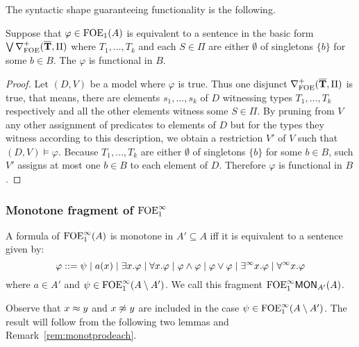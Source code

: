 The syntactic shape guaranteeing functionality is the following.
\begin{proposition}\label{lemma:functionalsentenceofoe} Suppose that $\varphi \in \mathrm{FOE}_1(A)$ is equivalent to a sentence in the basic form $\bigvee \nabla^+_{\mathrm{FOE}}(\overline{{\mathbf{T}}},\Pi)$ where $T_1, \dots, T_k$ and each $S \in \Pi$ are either $\emptyset$ of singletons $\{b\}$ for some $b \in B$. The $\varphi$ is functional in $B$.
\end{proposition}
\begin{proof} Let $(D,V)$ be a model where $\varphi$ is true. Thus one disjunct $\nabla^+_{\mathrm{FOE}}(\overline{{\mathbf{T}}},\Pi)$ is true, that means, there are elements $s_1, \dots, s_k$ of $D$ witnessing types $T_1, \dots, T_k$ respectively and all the other elements witness some $S \in \Pi$. By pruning from $V$ any other assignment of predicates to elements of $D$ but for the types they witness according to this description, we obtain a restriction $V'$ of $V$ such that $(D,V) \models \varphi$. Because $T_1, \dots, T_k$ are either $\emptyset$ of singletons $\{b\}$ for some $b \in B$, such $V'$ assigns at most one $b \in B$ to each element of $D$. Therefore $\varphi$ is functional in $B$.
\end{proof}


\subsubsection{Monotone fragment of $\mathrm{FOE}^{\infty}_1$}

\begin{theorem}\label{thm:ofoeimonot}
A formula of $\mathrm{FOE}^{\infty}_1(A)$ is monotone in ${A' \subseteq A}$ iff it is equivalent to a sentence given by:
\[
\varphi ::= \psi \mid a(x) \mid \exists x.\varphi \mid \forall x.\varphi \mid \varphi \land \varphi \mid \varphi \lor \varphi \mid \exists^\infty x.\varphi \mid \forall^\infty x.\varphi
\]
where $a\in A'$ and $\psi \in \mathrm{FOE}^{\infty}_1(A\setminus A')$. We call this fragment $\mathrm{FOE}^{\infty}_1\mathsf{MON}_{A'}(A)$.
\end{theorem}

Observe that $x \approx y$ and $x \not\approx y$ are included in the case $\psi \in \mathrm{FOE}^{\infty}_1(A\setminus A')$. The result will follow from the following two lemmas and Remark~\ref{rem:monotprodeach}.

